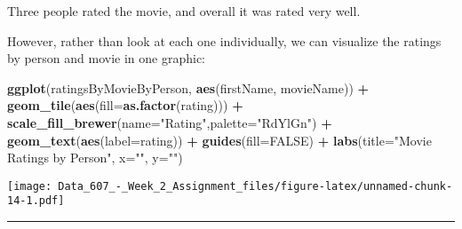 \documentclass[]{article}
\newenvironment{Shaded}{\begin{snugshade}}{\end{snugshade}}
\newcommand{\KeywordTok}[1]{\textcolor[rgb]{0.13,0.29,0.53}{\textbf{#1}}}
\newcommand{\DataTypeTok}[1]{\textcolor[rgb]{0.13,0.29,0.53}{#1}}
\newcommand{\StringTok}[1]{\textcolor[rgb]{0.31,0.60,0.02}{#1}}
\newcommand{\OtherTok}[1]{\textcolor[rgb]{0.56,0.35,0.01}{#1}}
\newcommand{\OperatorTok}[1]{\textcolor[rgb]{0.81,0.36,0.00}{\textbf{#1}}}
\newcommand{\NormalTok}[1]{#1}
\begin{document}
Three people rated the movie, and overall it was rated very well.

However, rather than look at each one individually, we can visualize the
ratings by person and movie in one graphic:

\begin{Shaded}
\begin{Highlighting}[]
\KeywordTok{ggplot}\NormalTok{(ratingsByMovieByPerson, }\KeywordTok{aes}\NormalTok{(firstName, movieName)) }\OperatorTok{+}\StringTok{ }\KeywordTok{geom_tile}\NormalTok{(}\KeywordTok{aes}\NormalTok{(}\DataTypeTok{fill=}\KeywordTok{as.factor}\NormalTok{(rating))) }\OperatorTok{+}\StringTok{ }\KeywordTok{scale_fill_brewer}\NormalTok{(}\DataTypeTok{name=}\StringTok{"Rating"}\NormalTok{,}\DataTypeTok{palette=}\StringTok{"RdYlGn"}\NormalTok{) }\OperatorTok{+}\StringTok{ }\KeywordTok{geom_text}\NormalTok{(}\KeywordTok{aes}\NormalTok{(}\DataTypeTok{label=}\NormalTok{rating)) }\OperatorTok{+}\StringTok{ }\KeywordTok{guides}\NormalTok{(}\DataTypeTok{fill=}\OtherTok{FALSE}\NormalTok{) }\OperatorTok{+}\StringTok{ }\KeywordTok{labs}\NormalTok{(}\DataTypeTok{title=}\StringTok{"Movie Ratings by Person"}\NormalTok{, }\DataTypeTok{x=}\StringTok{""}\NormalTok{, }\DataTypeTok{y=}\StringTok{""}\NormalTok{)}
\end{Highlighting}
\end{Shaded}

\texttt{[image: Data\_607\_-\_Week\_2\_Assignment\_files/figure-latex/unnamed-chunk-14-1.pdf]}

\begin{center}\rule{0.5\linewidth}{\linethickness}\end{center}
\end{document}
